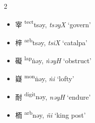 \begin{multicols}{2}
\begin{itemize}

    \item {\Large{宰}} %
    {\large{{\textsuperscript{tect}}tsəy}},
    \textit{tsəyX} %
    `govern'

    \item {\Large{梓}} %
    {\large{{\textsuperscript{arb}}tsəy}},
    \textit{tsiX} %
    `catalpa'

\end{itemize}

\medskip

\begin{itemize}


    \item {\Large{礙}} %
    {\large{{\textsuperscript{lap}ṅəy}}},
    \textit{ṅəyH} %
    `obstruct'

    \item {\Large{嶷}} %
    {\large{{\textsuperscript{mon}ṅəy}}},
    \textit{ṅi} %
    `lofty'

\end{itemize}

\medskip

\begin{itemize}


    \item {\Large{耐}} %
    {\large{{\textsuperscript{digit}nəy}}},
    \textit{nəyH} %
    `endure'

    \item {\Large{栭}} %
    {\large{{\textsuperscript{arb}nəy}}},
    \textit{ñi} %
    `king post'


\end{itemize}


\end{multicols}
